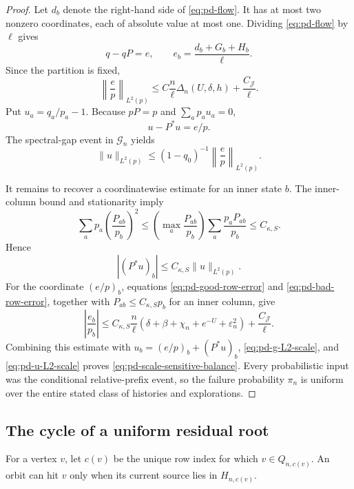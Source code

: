 \documentclass[11pt]{article}
\theoremstyle{remark}
\begin{document}
\begin{proof}
Let $d_b$ denote the right-hand side of \eqref{eq:pd-flow}.  It has at most
two nonzero coordinates, each of absolute value at most one.  Dividing
\eqref{eq:pd-flow} by $\ell$ gives
\[
        q-qP=e,
        \qquad e_b=\frac{d_b+G_b+H_b}{\ell}.
\]
Since the partition is fixed,
\begin{equation}
 \left\|\frac e p\right\|_{L^2(p)}
 \le C\frac n\ell\Delta_n(U,\delta,h)
      +\frac{C_{\mathcal J}}\ell.
 \label{eq:pd-g-L2-scale}
\end{equation}
Put $u_a=q_a/p_a-1$.  Because $pP=p$ and $\sum_ap_au_a=0$,
\[
        u-P^*u=e/p.
\]
The spectral-gap event in $\mathcal G_n$ yields
\begin{equation}
 \|u\|_{L^2(p)}
 \le(1-q_0)^{-1}\left\|\frac e p\right\|_{L^2(p)}.
 \label{eq:pd-u-L2-scale}
\end{equation}

It remains to recover a coordinatewise estimate for an inner state $b$.
The inner-column bound and stationarity imply
\[
 \sum_a p_a\left(\frac{P_{ab}}{p_b}\right)^2
 \le \left(\max_a\frac{P_{ab}}{p_b}\right)
      \sum_a\frac{p_aP_{ab}}{p_b}
 \le C_{\kappa,S}.
\]
Hence
\[
        |(P^*u)_b|\le C_{\kappa,S}\|u\|_{L^2(p)}.
\]
For the coordinate $(e/p)_b$, equations
\eqref{eq:pd-good-row-error} and \eqref{eq:pd-bad-row-error}, together with
$P_{ab}\le C_{\kappa,S}p_b$ for an inner column, give
\[
 \left|\frac{e_b}{p_b}\right|
 \le C_{\kappa,S}\frac n\ell
      \left(\delta+\beta+\chi_n+e^{-U}+\varepsilon_n^2\right)
      +\frac{C_{\mathcal J}}\ell.
\]
Combining this estimate with
$u_b=(e/p)_b+(P^*u)_b$, \eqref{eq:pd-g-L2-scale}, and
\eqref{eq:pd-u-L2-scale} proves
\eqref{eq:pd-scale-sensitive-balance}.  Every probabilistic input was the
conditional relative-prefix event, so the failure probability $\pi_n$ is
uniform over the entire stated class of histories and explorations.
\end{proof}

\subsection{The cycle of a uniform residual root}

For a vertex $v$, let $c(v)$ be the unique row index for which
$v\in Q_{n,c(v)}$.  An orbit can hit $v$ only when its current source lies in
$H_{n,c(v)}$.
\end{document}
